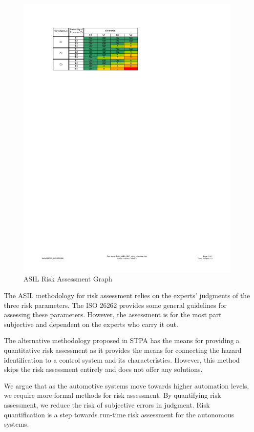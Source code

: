 \begin{figure}
	\centering
	\includegraphics[width=0.9\linewidth]{./figures/ASIL}
	\caption{ASIL Risk Assessment Graph}
	\label{Fig:ASILGraph}
\end{figure}

The ASIL methodology for risk assessment relies on the experts’ judgments of the three risk parameters. The ISO 26262 provides some general guidelines for assessing these parameters. However, the assessment is for the most part subjective and dependent on the experts who carry it out. 

The alternative methodology proposed in STPA has the means for providing a quantitative risk assessment as it provides the means for connecting the hazard identification to a control system and its characteristics. However, this method skips the risk assessment entirely and does not offer any solutions. 

We argue that as the automotive systems move towards higher automation levels, we require more formal methods for risk assessment. By quantifying risk assessment, we reduce the risk of subjective errors in judgment. Risk quantification is a step towards run-time risk assessment for the autonomous systems.  


